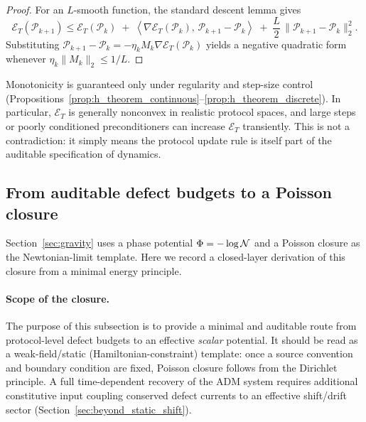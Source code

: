 \begin{proof}
For an $L$-smooth function, the standard descent lemma gives
\[
\mathcal{E}_T(\mathcal{P}_{k+1})\le \mathcal{E}_T(\mathcal{P}_k)
\;+\;
\left\langle \nabla\mathcal{E}_T(\mathcal{P}_k),\,\mathcal{P}_{k+1}-\mathcal{P}_k\right\rangle
\;+\;\frac{L}{2}\,\|\mathcal{P}_{k+1}-\mathcal{P}_k\|_2^2.
\]
Substituting $\mathcal{P}_{k+1}-\mathcal{P}_k=-\eta_k M_k\nabla\mathcal{E}_T(\mathcal{P}_k)$ yields a negative quadratic form whenever $\eta_k\|M_k\|_2\le 1/L$.
\end{proof}

\begin{remark}
\label{rem:h_theorem_failure_modes}
Monotonicity is guaranteed only under regularity and step-size control (Propositions~\ref{prop:h_theorem_continuous}--\ref{prop:h_theorem_discrete}).
In particular, $\mathcal{E}_T$ is generally nonconvex in realistic protocol spaces, and large steps or poorly conditioned preconditioners can increase $\mathcal{E}_T$ transiently.
This is not a contradiction: it simply means the protocol update rule is itself part of the auditable specification of dynamics.
\end{remark}

\subsection{From auditable defect budgets to a Poisson closure}
\label{sec:poisson_from_action}

Section~\ref{sec:gravity} uses a phase potential $\Phi=-\log\mathcal{N}$ and a Poisson closure as the Newtonian-limit template.
Here we record a closed-layer derivation of this closure from a minimal energy principle.

\paragraph{Scope of the closure.}
The purpose of this subsection is to provide a minimal and auditable route from protocol-level defect budgets to an effective \emph{scalar} potential.
It should be read as a weak-field/static (Hamiltonian-constraint) template: once a source convention and boundary condition are fixed, Poisson closure follows from the Dirichlet principle.
A full time-dependent recovery of the ADM system requires additional constitutive input coupling conserved defect currents to an effective shift/drift sector (Section~\ref{sec:beyond_static_shift}).

